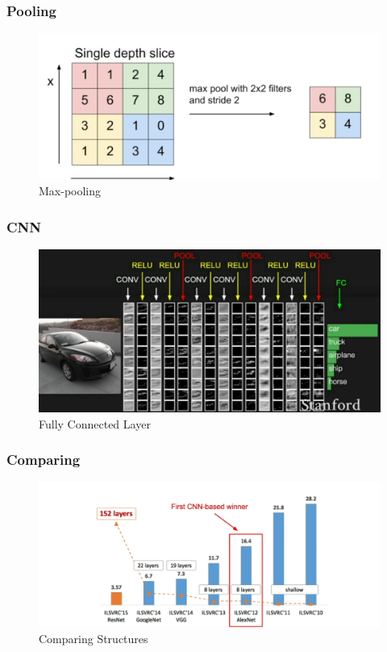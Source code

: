 \documentclass{beamer}
\begin{document}
\begin{frame}
\frametitle{Pooling}

\begin{figure}
	\includegraphics[width=\linewidth]{Pics/pooling.png}
	\caption{Max-pooling}
\end{figure}

\end{frame}

\begin{frame}
\frametitle{CNN}

\begin{figure}
	\includegraphics[width=\linewidth]{Pics/cexample.png}
	\caption{Fully Connected Layer}
\end{figure}

\end{frame}



\begin{frame}
\frametitle{Comparing}

\begin{figure}
	\includegraphics[width=\linewidth]{Pics/comaprecnn.png}
	\caption{Comparing Structures}
\end{figure}

\end{frame}
\end{document}
